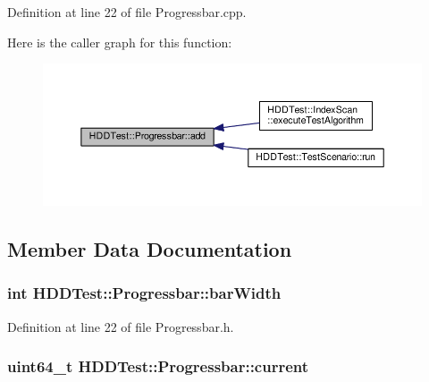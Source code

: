 Definition at line 22 of file Progressbar.\-cpp.



Here is the caller graph for this function\-:\nopagebreak
\begin{figure}[H]
\begin{center}
\leavevmode
\includegraphics[width=350pt]{class_h_d_d_test_1_1_progressbar_a031bb6b1e7a3305d441bc10353c37966_icgraph}
\end{center}
\end{figure}




\subsection{Member Data Documentation}
\hypertarget{class_h_d_d_test_1_1_progressbar_a754f1137a1b68fced60aebfc87269a84}{
\subsubsection[{bar\-Width}]{\setlength{\rightskip}{0pt plus 5cm}int H\-D\-D\-Test\-::\-Progressbar\-::bar\-Width}}\label{class_h_d_d_test_1_1_progressbar_a754f1137a1b68fced60aebfc87269a84}


Definition at line 22 of file Progressbar.\-h.

\hypertarget{class_h_d_d_test_1_1_progressbar_a8064f75e6a8ad05753bbff8752d6a5a7}{
\subsubsection[{current}]{\setlength{\rightskip}{0pt plus 5cm}uint64\-\_\-t H\-D\-D\-Test\-::\-Progressbar\-::current}}\label{class_h_d_d_test_1_1_progressbar_a8064f75e6a8ad05753bbff8752d6a5a7}


